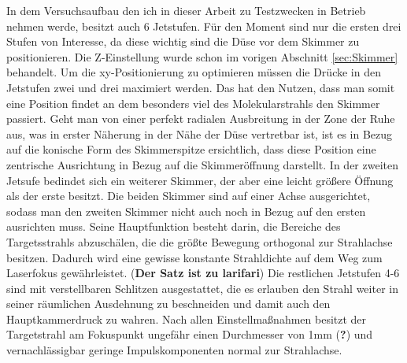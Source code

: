In dem Versuchsaufbau den ich in dieser Arbeit zu Testzwecken in Betrieb nehmen werde, besitzt auch 6 Jetstufen. Für den Moment sind nur die ersten drei Stufen von Interesse, da diese wichtig sind die Düse vor dem Skimmer zu positionieren. Die Z-Einstellung wurde schon im vorigen Abschnitt \ref{sec:Skimmer} behandelt. Um die xy-Positionierung zu optimieren müssen die Drücke in den Jetstufen zwei und drei maximiert werden. Das hat den Nutzen, dass man somit eine Position findet an dem besonders viel des Molekularstrahls den Skimmer passiert. Geht man von einer perfekt radialen Ausbreitung in der Zone der Ruhe aus, was in erster Näherung in der Nähe der Düse vertretbar ist, ist es in Bezug auf die konische Form des Skimmerspitze ersichtlich, dass diese Position eine zentrische Ausrichtung in Bezug auf die Skimmeröffnung darstellt. 
In der zweiten Jetsufe bedindet sich ein weiterer Skimmer, der aber eine leicht größere Öffnung als der erste besitzt. Die beiden Skimmer sind auf einer Achse ausgerichtet, sodass man den zweiten Skimmer nicht auch noch in Bezug auf den ersten ausrichten muss. Seine Hauptfunktion besteht darin, die Bereiche des Targetsstrahls abzuschälen, die die größte Bewegung orthogonal zur Strahlachse besitzen. Dadurch wird eine gewisse konstante Strahldichte auf dem Weg zum Laserfokus gewährleistet. (\textbf{Der Satz ist zu larifari}) 
Die restlichen Jetstufen 4-6 sind mit verstellbaren Schlitzen ausgestattet, die es erlauben den Strahl weiter in seiner räumlichen Ausdehnung zu beschneiden und damit auch den Hauptkammerdruck zu wahren. Nach allen Einstellmaßnahmen besitzt der Targetstrahl am Fokuspunkt ungefähr einen Durchmesser von 1mm (\textbf{?}) und vernachlässigbar geringe Impulskomponenten normal zur Strahlachse.
%
%
%
%
%
%
